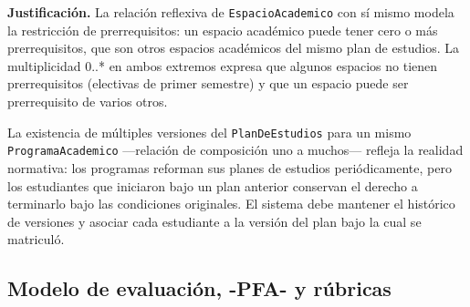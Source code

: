 \textbf{Justificación.} La relación reflexiva de \texttt{EspacioAcademico}
con sí mismo modela la restricción de prerrequisitos: un espacio académico
puede tener cero o más prerrequisitos, que son otros espacios académicos
del mismo plan de estudios. La multiplicidad 0..* en ambos extremos expresa
que algunos espacios no tienen prerrequisitos (electivas de primer semestre)
y que un espacio puede ser prerrequisito de varios otros.

La existencia de múltiples versiones del \texttt{PlanDeEstudios} para un
mismo \texttt{ProgramaAcademico} ---relación de composición uno a muchos---
refleja la realidad normativa: los programas reforman sus planes de estudios
periódicamente, pero los estudiantes que iniciaron bajo un plan anterior
conservan el derecho a terminarlo bajo las condiciones originales. El sistema
debe mantener el histórico de versiones y asociar cada estudiante a la versión
del plan bajo la cual se matriculó.

\subsection{Modelo de evaluación, -PFA- y rúbricas}
\label{subsec:modelo-evaluacion}

